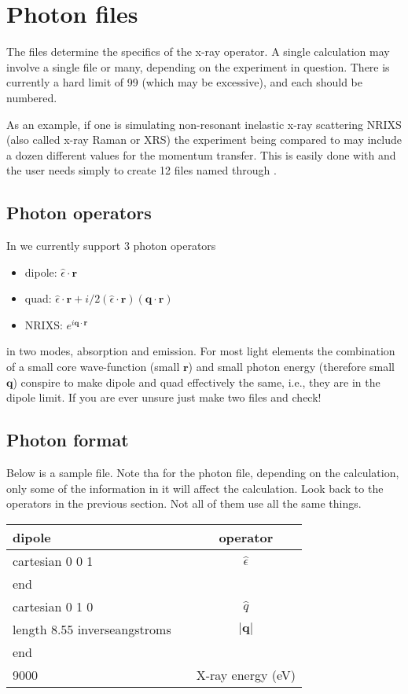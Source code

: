 \documentclass[11pt]{report}
\begin{document}
\section{Photon files}
\label{photon_files}
The  files determine the specifics of the x-ray operator. A single  
calculation may involve a single  file or many, depending on the experiment in question. 
There is currently a hard limit of 99 (which may be excessive), and each should be numbered. 

As an example, if one is simulating non-resonant inelastic x-ray scattering NRIXS (also called x-ray Raman or XRS) 
the experiment being compared to may include a dozen different values for the momentum transfer. 
This is easily done with  and the user needs simply to create 12 files 
named  through .  

\subsection{Photon operators}
In  we currently support 3 photon operators
\begin{itemize}
\item dipole: $\hat{\epsilon} \cdot \mathbf{r}$
\item quad: $\hat{\epsilon} \cdot \mathbf{r} + i/2 \left( \hat{\epsilon} \cdot \mathbf{r} \right) \left(\mathbf{q} \cdot \mathbf{r} \right)$
\item NRIXS: $e^{i \mathbf{q} \cdot \mathbf{r} }$
\end{itemize}
in two modes, absorption and emission. For most light elements the combination of a small core 
wave-function (small $\mathbf{r}$) and small photon energy (therefore small $\mathbf{q}$) 
conspire to make dipole and quad effectively the same, i.e., they are in the dipole limit. 
If you are ever unsure just make two  files and check!

\subsection{Photon format}
Below is a sample  file. Note tha for the photon file, 
depending on the calculation, only some of the information in it will affect the calculation. 
Look back to the operators in the previous section. Not all of them use all the same things. 

\begin{center}
\begin{tabular}{| l | c c|}
\hline
dipole				& & operator \\
\hline
cartesian  0  0  1		& & $\hat{\epsilon}$  \\
end			& & \\
\hline
cartesian  0  1  0		& & $\hat{q}$  \\
length 8.55 inverseangstroms && $\vert \mathbf{q} \vert$ \\
end			& & \\
\hline
9000 & & X-ray energy (eV) \\
\hline
\end{tabular}
\end{center}
\end{document}
